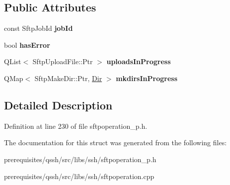 \subsection*{Public Attributes}
\begin{DoxyCompactItemize}
\item 
\mbox{\label{struct_q_ssh_1_1_internal_1_1_sftp_upload_dir_ac52db75af631960c10db97133833d871}} 
const Sftp\+Job\+Id {\bfseries job\+Id}
\item 
\mbox{\label{struct_q_ssh_1_1_internal_1_1_sftp_upload_dir_a0fa8565ee9556c3715567fac55b41749}} 
bool {\bfseries has\+Error}
\item 
\mbox{\label{struct_q_ssh_1_1_internal_1_1_sftp_upload_dir_a1e73993b85a71b05da2c54d1835d2136}} 
Q\+List$<$ Sftp\+Upload\+File\+::\+Ptr $>$ {\bfseries uploads\+In\+Progress}
\item 
\mbox{\label{struct_q_ssh_1_1_internal_1_1_sftp_upload_dir_a42e960c1b703ac7ce8c64ee593589aba}} 
Q\+Map$<$ Sftp\+Make\+Dir\+::\+Ptr, \mbox{\hyperlink{struct_q_ssh_1_1_internal_1_1_sftp_upload_dir_1_1_dir}{Dir}} $>$ {\bfseries mkdirs\+In\+Progress}
\end{DoxyCompactItemize}


\subsection{Detailed Description}


Definition at line 230 of file sftpoperation\+\_\+p.\+h.



The documentation for this struct was generated from the following files\+:\begin{DoxyCompactItemize}
\item 
prerequisites/qssh/src/libs/ssh/sftpoperation\+\_\+p.\+h\item 
prerequisites/qssh/src/libs/ssh/sftpoperation.\+cpp\end{DoxyCompactItemize}
